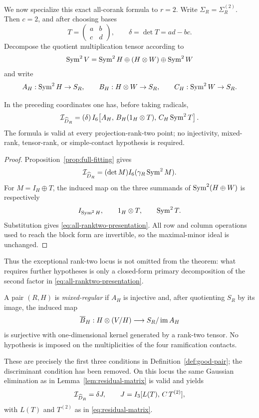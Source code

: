 We now specialize this exact all-corank formula to $r=2$.  Write
$\Sigma_R=\Sigma_R^{(2)}$.  Then $c=2$, and after choosing bases
\[
 T=\begin{pmatrix}a&b\\c&d\end{pmatrix},
 \qquad
 \delta=\det T=ad-bc.
\]
Decompose the quotient multiplication tensor according to
\[
 \operatorname{Sym}^2V=\operatorname{Sym}^2H\oplus(H\otimes W)\oplus\operatorname{Sym}^2W
\]
and write
\[
 A_H:\operatorname{Sym}^2H\to S_R,\qquad
 B_H:H\otimes W\to S_R,\qquad
 C_H:\operatorname{Sym}^2W\to S_R.
\]

\begin{theorem}
\label{thm:ranktwo-full-presentation}
In the preceding coordinates one has, before taking radicals,
\begin{equation}\label{eq:all-ranktwo-presentation}
 \mathcal I_{\widehat D_R}
 =
 (\delta)\,
 I_6\!\left[
 A_H,\,
 B_H(1_H\otimes T),\,
 C_H\operatorname{Sym}^2T
 \right].
\end{equation}
The formula is valid at every projection-rank-two point; no
injectivity, mixed-rank, tensor-rank, or simple-contact hypothesis is
required.
\end{theorem}
\begin{proof}
Proposition~\ref{prop:full-fitting} gives
\[
 \mathcal I_{\widehat D_R}
 =(\det M)I_6(\gamma_R\operatorname{Sym}^2M).
\]
For $M=I_H\oplus T$, the induced map on the three summands of
$\operatorname{Sym}^2(H\oplus W)$ is respectively
\[
 I_{\operatorname{Sym}^2H},\qquad 1_H\otimes T,\qquad\operatorname{Sym}^2T.
\]
Substitution gives \eqref{eq:all-ranktwo-presentation}.  All row and
column operations used to reach the block form are invertible, so the
maximal-minor ideal is unchanged.
\end{proof}

Thus the exceptional rank-two locus is not omitted from the theorem:
what requires further hypotheses is only a closed-form primary
decomposition of the second factor in
\eqref{eq:all-ranktwo-presentation}.

\begin{definition}\label{def:mixed-regular}
A pair $(R,H)$ is \emph{mixed-regular} if
$A_H$ is injective and, after quotienting $S_R$ by its image, the
induced map
\[
 \overline B_H:H\otimes(V/H)\longrightarrow
 S_R/\operatorname{im} A_H
\]
is surjective with one-dimensional kernel generated by a rank-two
tensor.  No hypothesis is imposed on the multiplicities of the four
ramification contacts.
\end{definition}

These are precisely the first three conditions in
Definition~\ref{def:good-pair}; the discriminant condition has been
removed.  On this locus the same Gaussian elimination as in
Lemma~\ref{lem:residual-matrix} is valid and yields
\[
 \mathcal I_{\widehat D_R}=\delta J,\qquad
 J=I_3[L(T),\,C\,T^{(2)}],
\]
with $L(T)$ and $T^{(2)}$ as in \eqref{eq:residual-matrix}.

